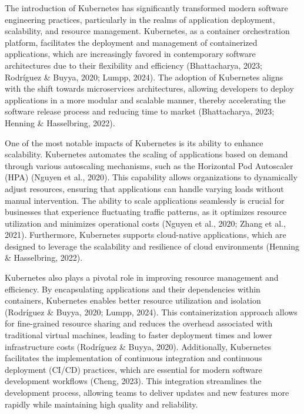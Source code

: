 The introduction of Kubernetes has significantly transformed modern software engineering practices, particularly in the realms of application deployment, scalability, and resource management. Kubernetes, as a container orchestration platform, facilitates the deployment and management of containerized applications, which are increasingly favored in contemporary software architectures due to their flexibility and efficiency (Bhattacharya, 2023; Rodríguez & Buyya, 2020; Lumpp, 2024). The adoption of Kubernetes aligns with the shift towards microservices architectures, allowing developers to deploy applications in a more modular and scalable manner, thereby accelerating the software release process and reducing time to market (Bhattacharya, 2023; Henning & Hasselbring, 2022).

One of the most notable impacts of Kubernetes is its ability to enhance scalability. Kubernetes automates the scaling of applications based on demand through various autoscaling mechanisms, such as the Horizontal Pod Autoscaler (HPA) (Nguyen et al., 2020). This capability allows organizations to dynamically adjust resources, ensuring that applications can handle varying loads without manual intervention. The ability to scale applications seamlessly is crucial for businesses that experience fluctuating traffic patterns, as it optimizes resource utilization and minimizes operational costs (Nguyen et al., 2020; Zhang et al., 2021). Furthermore, Kubernetes supports cloud-native applications, which are designed to leverage the scalability and resilience of cloud environments (Henning & Hasselbring, 2022).

Kubernetes also plays a pivotal role in improving resource management and efficiency. By encapsulating applications and their dependencies within containers, Kubernetes enables better resource utilization and isolation (Rodríguez & Buyya, 2020; Lumpp, 2024). This containerization approach allows for fine-grained resource sharing and reduces the overhead associated with traditional virtual machines, leading to faster deployment times and lower infrastructure costs (Rodríguez & Buyya, 2020). Additionally, Kubernetes facilitates the implementation of continuous integration and continuous deployment (CI/CD) practices, which are essential for modern software development workflows (Cheng, 2023). This integration streamlines the development process, allowing teams to deliver updates and new features more rapidly while maintaining high quality and reliability.

